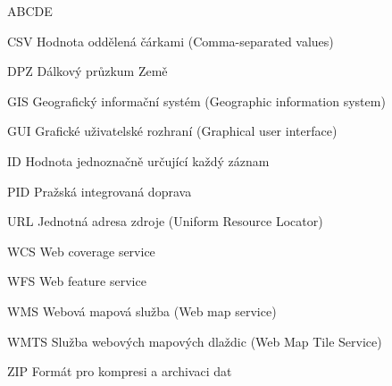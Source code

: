 
\begin{seznamzkratek}{ABCDE}      
	             	                   
          {CSV}
          {Hodnota oddělená čárkami (Comma-separated values)} 
          
	      {DPZ}
	      {Dálkový průzkum Země}  
          
	      {GIS}
	      {Geografický informační systém (Geographic information system)}

	      {GUI}
	      {Grafické uživatelské rozhraní (Graphical user interface)}
	               	             
	      {ID}
	      {Hodnota jednoznačně určující každý záznam} 	      	     

	      {PID}
	      {Pražská integrovaná doprava} 	
	          
          {URL}
          {Jednotná adresa zdroje (Uniform Resource Locator)}                
          
	      {WCS}
	      {Web coverage service}
                                          
	      {WFS}
	      {Web feature service}         
            
	      {WMS}
	      {Webová mapová služba (Web map service)} 	

	      {WMTS}
	      {Služba webových mapových dlaždic (Web Map Tile Service)} 
          
          {ZIP}
          {Formát pro kompresi a archivaci dat} 	
          
	      	      
\end{seznamzkratek}
